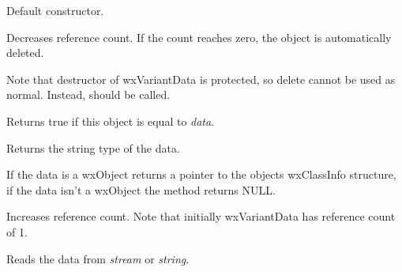 

\label{wxvariantdatactor}


Default constructor.

\label{wxvariantdatadecref}


Decreases reference count. If the count reaches zero, the object is
automatically deleted.

Note that destructor of wxVariantData is protected, so delete
cannot be used as normal. Instead,  should be called.



\label{wxvariantdataeq}


Returns true if this object is equal to {\it data}.

\label{wxvariantdatagettype}


Returns the string type of the data.

\label{wxvariantdatagetvalueclassinfo}


If the data is a wxObject returns a pointer to the objects wxClassInfo structure, if
the data isn't a wxObject the method returns NULL.

\label{wxvariantdataincref}


Increases reference count. Note that initially wxVariantData has reference count of 1.

\label{wxvariantdataread}



Reads the data from {\it stream} or {\it string}.

\label{wxvariantdatawrite}

